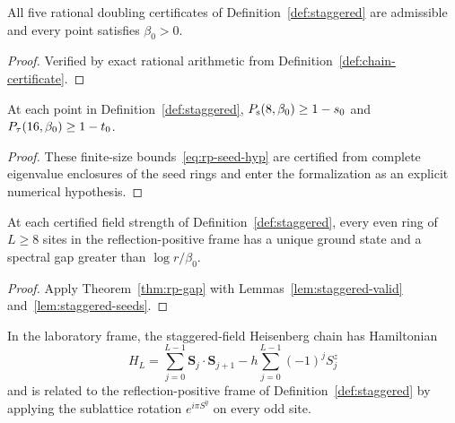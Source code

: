 \begin{lemma}
  \label{lem:staggered-valid}
  \leanok
  All five rational doubling certificates of Definition~\ref{def:staggered} are admissible and every
  point satisfies \(\beta_0 > 0\).
\end{lemma}
\begin{proof}
  \leanok
  Verified by exact rational arithmetic from Definition~\ref{def:chain-certificate}.
\end{proof}

\begin{lemma}
  \label{lem:staggered-seeds}
  \leanok
  At each point in Definition~\ref{def:staggered}, \(P_{\mathrm{s}}(8, \beta_0) \ge 1 - s_0\) and
  \(P_{\tau}(16, \beta_0) \ge 1 - t_0\).
\end{lemma}
\begin{proof}
  These finite-size bounds~\eqref{eq:rp-seed-hyp} are certified from complete eigenvalue enclosures
  of the seed rings and enter the formalization as an explicit numerical hypothesis.
\end{proof}

\begin{theorem}
  \label{thm:staggered-gap}
  \leanok
  At each certified field strength of Definition~\ref{def:staggered}, every even ring of
  \(L \ge 8\) sites in the reflection-positive frame has a unique ground state and a spectral gap
  greater than \(\log r / \beta_0\).
\end{theorem}
\begin{proof}
  \leanok
  Apply Theorem~\ref{thm:rp-gap} with Lemmas~\ref{lem:staggered-valid} and~\ref{lem:staggered-seeds}.
\end{proof}

\begin{definition}
  \label{def:staggered-physical}
  \leanok
  In the laboratory frame, the staggered-field Heisenberg chain has Hamiltonian
  \begin{equation}
    \label{eq:staggered-ham}
    H_L = \sum_{j=0}^{L-1} \mathbf S_j \cdot \mathbf S_{j+1} - h \sum_{j=0}^{L-1} (-1)^j S^z_j
  \end{equation}
  and is related to the reflection-positive frame of Definition~\ref{def:staggered} by applying the
  sublattice rotation \(e^{i\pi S^y}\) on every odd site.
\end{definition}

